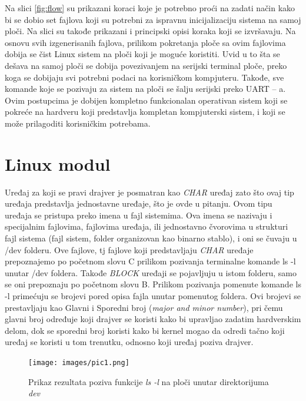 \documentclass[a4paper, 12pt, diplomski]{etf}
\begin{document}
	Na slici \ref{fig:flow} su prikazani koraci koje je potrebno proći na zadati način kako bi se dobio set fajlova koji su potrebni za ispravnu inicijalizaciju sistema na samoj ploči. Na slici su takođe prikazani i principski opisi koraka koji se izvršavaju. Na osnovu svih izgenerisanih fajlova, prilikom pokretanja ploče sa ovim fajlovima dobija se čist Linux sistem na ploči koji je moguće koristiti. Uvid u to šta se dešava na samoj ploči se dobija povezivanjem na serijski terminal ploče, preko koga se dobijaju svi potrebni podaci na korisničkom kompjuteru. Takođe, sve komande koje se pozivaju za sistem na ploči se šalju serijski preko UART – a. Ovim postupcima je dobijen kompletno funkcionalan operativan sistem koji se pokreće na hardveru koji predstavlja kompletan kompjuterski sistem, i koji se može prilagoditi korisničkim potrebama.

	\section{Linux modul}
	Uređaj za koji se pravi drajver je posmatran kao \textit{CHAR} uređaj zato što ovaj tip uređaja predstavlja jednostavne uređaje, što je ovde u pitanju. Ovom tipu uređaja se pristupa preko imena u fajl sistemima. Ova imena se nazivaju i specijalnim fajlovima, fajlovima uređaja, ili jednostavno čvorovima u strukturi fajl sistema (fajl sistem, folder organizovan kao binarno stablo), i oni se čuvaju u /dev folderu. Ove fajlove, tj fajlove koji predstavljaju \textit{CHAR} uređaje prepoznajemo po početnom slovu C prilikom pozivanja terminalne komande ls -l unutar /dev foldera. Takođe \textit{BLOCK} uređaji se pojavljuju u istom folderu, samo se oni prepoznaju po početnom slovu B. Prilikom pozivanja pomenute komande ls -l primećuju se brojevi pored opisa fajla unutar pomenutog foldera. Ovi brojevi se prestavljaju kao Glavni i Sporedni broj (\textit{major and minor number}), pri čemu glavni broj određuje koji drajver se koristi kako bi upravljao zadatim hardverskim delom, dok se sporedni broj koristi kako bi kernel mogao da odredi tačno koji uređaj se koristi u tom trenutku, odnosno koji uređaj poziva drajver.

	\begin{figure}[h!]
		\centering
		\texttt{[image: images/pic1.png]}
		\caption{Prikaz rezultata poziva funkcije \textit{ls -l} na ploči unutar direktorijuma \textit{dev}}
		\label{fig:lsl}
	\end{figure}

	\bigskip
\end{document}
